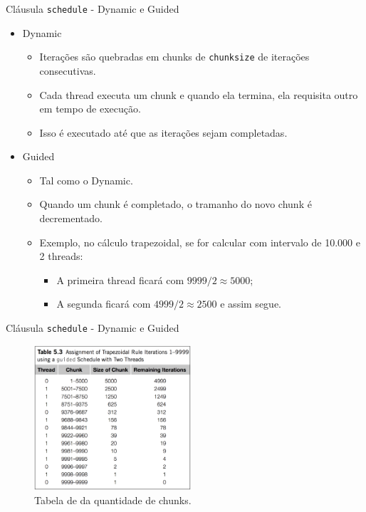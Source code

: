 	
	\begin{frame}{Cláusula {\tt schedule} - Dynamic e Guided}
		\begin{itemize}
			\item Dynamic
			\begin{itemize}
				\item Iterações são quebradas em chunks de {\tt chunksize} de iterações consecutivas.
				\item Cada thread executa um chunk e quando ela termina, ela requisita outro em tempo de execução.
				\item Isso é executado até que as iterações sejam completadas.
			\end{itemize}
			\item Guided
			\begin{itemize}
				\item Tal como o Dynamic.
				\item Quando um chunk é completado, o tramanho do novo chunk é decrementado.
				\item Exemplo, no cálculo trapezoidal, se for calcular com intervalo de 10.000 e 2 threads: 
				\begin{itemize}
					\item A primeira thread ficará com $9999/2 \approx 5000$;
					\item A segunda ficará com $4999/2 \approx 2500$ e assim segue.
				\end{itemize}
			\end{itemize}
		\end{itemize}
	\end{frame}

	\begin{frame}{Cláusula {\tt schedule} - Dynamic e Guided}
		\begin{figure}[p]
			\centering
			\includegraphics[width=0.52\textwidth]{img/pacheco/dynamic-guided.png}
			\caption{Tabela de da quantidade de chunks.}
		\end{figure}
	\end{frame}

